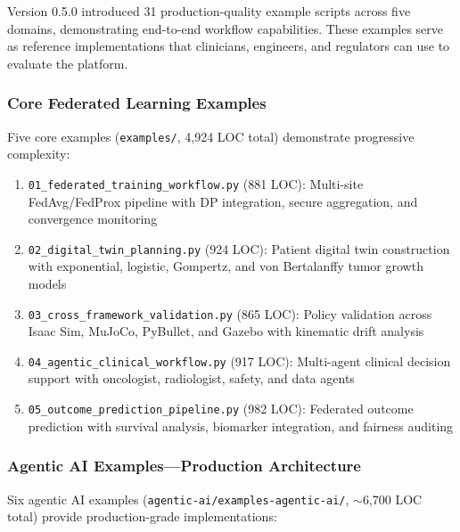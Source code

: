 Version 0.5.0 introduced 31 production-quality example scripts across five domains, demonstrating end-to-end workflow capabilities. These examples serve as reference implementations that clinicians, engineers, and regulators can use to evaluate the platform.

\subsubsection{Core Federated Learning Examples}

Five core examples (\texttt{examples/}, 4,924 LOC total) demonstrate progressive complexity:
\begin{enumerate}
  \item \texttt{01\_federated\_training\_workflow.py} (881 LOC): Multi-site FedAvg/FedProx pipeline with DP integration, secure aggregation, and convergence monitoring
  \item \texttt{02\_digital\_twin\_planning.py} (924 LOC): Patient digital twin construction with exponential, logistic, Gompertz, and von Bertalanffy tumor growth models
  \item \texttt{03\_cross\_framework\_validation.py} (865 LOC): Policy validation across Isaac Sim, MuJoCo, PyBullet, and Gazebo with kinematic drift analysis
  \item \texttt{04\_agentic\_clinical\_workflow.py} (917 LOC): Multi-agent clinical decision support with oncologist, radiologist, safety, and data agents
  \item \texttt{05\_outcome\_prediction\_pipeline.py} (982 LOC): Federated outcome prediction with survival analysis, biomarker integration, and fairness auditing
\end{enumerate}

\subsubsection{Agentic AI Examples---Production Architecture}

Six agentic AI examples (\texttt{agentic-ai/examples-agentic-ai/}, $\sim$6,700 LOC total) provide production-grade implementations:


